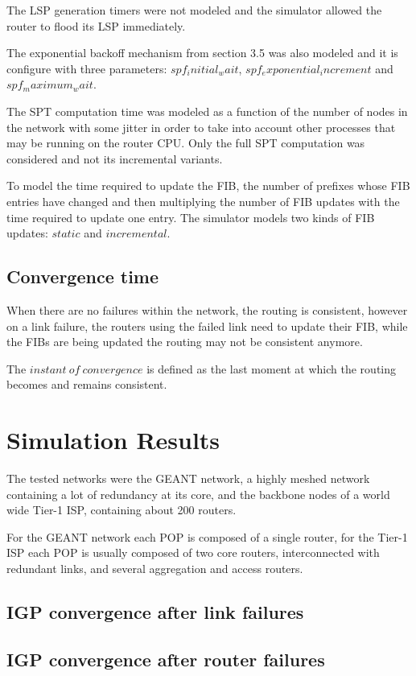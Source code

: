 \documentclass[a4paper, 11pt, UTF8]{article}
\begin{document}
The LSP generation timers were not modeled and the simulator allowed the router to flood its LSP immediately.

The exponential backoff mechanism from section 3.5 was also modeled and it is configure with three parameters: $spf_initial_wait$, $spf_exponential_increment$ and $spf_maximum_wait$.

The SPT computation time was modeled as a function of the number of nodes in the network with some jitter in order to take into account other processes that may be running on the router CPU.
Only the full SPT computation was considered and not its incremental variants.

To model the time required to update the FIB, 
the number of prefixes whose FIB entries have changed and then multiplying the number of FIB updates with the time required to update one entry.
The simulator models two kinds of FIB updates: $static$ and $incremental$.

\subsection{Convergence time}
When there are no failures within the network, the routing is consistent, however on a link failure, the routers using the failed link need to update their FIB, while the FIBs are being updated the routing may not be consistent anymore.

The $instant\ of\ convergence$ is defined as the last moment at which the routing becomes and remains consistent.

\section{Simulation Results}
The tested networks were the GEANT network, a highly meshed network containing a lot of redundancy at its core, 
and the backbone nodes of a world wide Tier-1 ISP, containing about 200 routers.

For the GEANT network each POP is composed of a single router, for the Tier-1 ISP each POP is usually composed of two core routers, interconnected with redundant links, and several aggregation and access routers.

\subsection{IGP convergence after link failures}

\subsection{IGP convergence after router failures}
\end{document}
